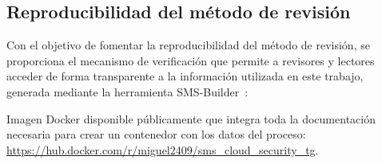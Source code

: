 \subsection{Reproducibilidad del método de revisión}\label{sec:reproducibilidad}

Con el objetivo de fomentar la reproducibilidad del método de revisión, se proporciona el mecanismo de verificación que permite a 
revisores y lectores acceder de forma transparente a la información utilizada en este trabajo, generada mediante la herramienta 
SMS-Builder~\cite{sms-builder-repo}:

Imagen Docker disponible públicamente que integra toda la documentación necesaria para crear un contenedor con los datos del proceso:
 \url{https://hub.docker.com/r/miguel2409/sms_cloud_security_tg}.
